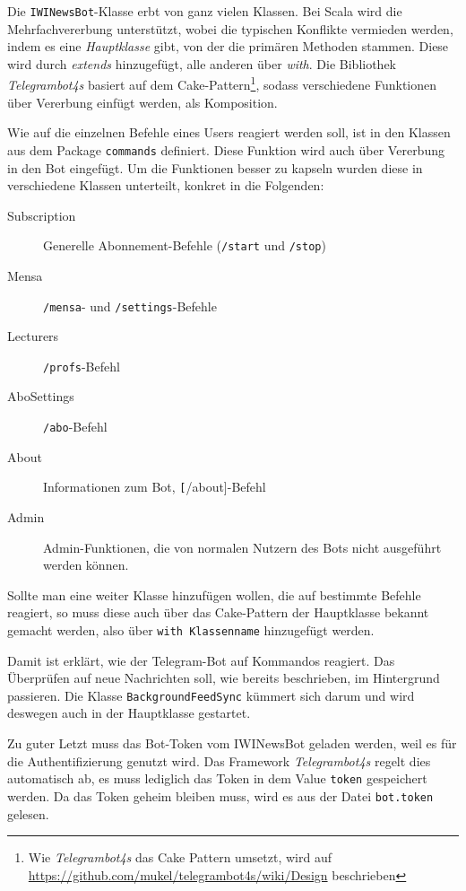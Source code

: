 Die \texttt{IWINewsBot}-Klasse erbt von ganz vielen Klassen. Bei Scala wird die Mehrfachvererbung unterstützt, wobei die typischen Konflikte vermieden werden, indem es eine \emph{Hauptklasse} gibt, von der die primären Methoden stammen. Diese wird durch \emph{extends} hinzugefügt, alle anderen über \emph{with}. Die Bibliothek \emph{Telegrambot4s} basiert auf dem Cake-Pattern\footnote{Wie \emph{Telegrambot4s} das Cake Pattern umsetzt, wird auf \url{https://github.com/mukel/telegrambot4s/wiki/Design} beschrieben}, sodass verschiedene Funktionen über Vererbung einfügt werden, als Komposition.

Wie auf die einzelnen Befehle eines Users reagiert werden soll, ist in den Klassen aus dem Package \texttt{commands} definiert. Diese Funktion wird auch über Vererbung in den Bot eingefügt. Um die Funktionen besser zu kapseln wurden diese in verschiedene Klassen unterteilt, konkret in die Folgenden:

\begin{description}
  \item[Subscription] Generelle Abonnement-Befehle (\texttt{/start} und \texttt{/stop})
  \item[Mensa] \texttt{/mensa}- und \texttt{/settings}-Befehle
  \item[Lecturers] \texttt{/profs}-Befehl
  \item[AboSettings] \texttt{/abo}-Befehl
  \item[About] Informationen zum Bot, \texttt[/about]-Befehl
  \item[Admin] Admin-Funktionen, die von normalen Nutzern des Bots nicht ausgeführt werden können.
\end{description}

Sollte man eine weiter Klasse hinzufügen wollen, die auf bestimmte Befehle reagiert, so muss diese auch über das Cake-Pattern der Hauptklasse bekannt gemacht werden, also über \texttt{with Klassenname} hinzugefügt werden.

Damit ist erklärt, wie der Telegram-Bot auf Kommandos reagiert. Das Überprüfen auf neue Nachrichten soll, wie bereits beschrieben, im Hintergrund passieren. Die Klasse \texttt{BackgroundFeedSync} kümmert sich darum und wird deswegen auch in der Hauptklasse gestartet.

Zu guter Letzt muss das Bot-Token vom IWINewsBot geladen werden, weil es für die  Authentifizierung genutzt wird. Das Framework \emph{Telegrambot4s} regelt dies automatisch ab, es muss lediglich das Token in dem Value \texttt{token} gespeichert werden. Da das Token geheim bleiben muss, wird es aus der Datei \texttt{bot.token} gelesen.

